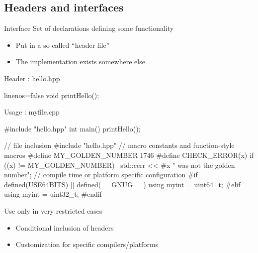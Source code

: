 \subsection[.h]{Headers and interfaces}

\begin{frame}[fragile]
  \begin{block}{Interface}
    Set of declarations defining some functionality
    \begin{itemize}
    \item Put in a so-called ``header file''
    \item The implementation exists somewhere else
    \end{itemize}
  \end{block}
  \begin{block}{Header : hello.hpp}
    \begin{cppcode*}{linenos=false}
      void printHello();
    \end{cppcode*}
  \end{block}
  \begin{block}{Usage : myfile.cpp}
    \begin{cppcode*}{}
      #include "hello.hpp"
      int main() {
        printHello();
      }
    \end{cppcode*}
  \end{block}
\end{frame}

\begin{frame}[fragile]
  \begin{cppcode}
    // file inclusion
    #include "hello.hpp"
    // macro constants and function-style macros
    #define MY_GOLDEN_NUMBER 1746
    #define CHECK_ERROR(x) if ((x) != MY_GOLDEN_NUMBER) \
      std::cerr << #x " was not the golden number\n";
    // compile time or platform specific configuration
    #if defined(USE64BITS) || defined(__GNUG__)
      using myint = uint64_t;
    #elif
      using myint = uint32_t;
    #endif
  \end{cppcode}
  \pause
  \begin{block}{Use only in very restricted cases}
    \begin{itemize}
    \item Conditional inclusion of headers
    \item Customization for specific compilers/platforms
    \end{itemize}
  \end{block}
\end{frame}

